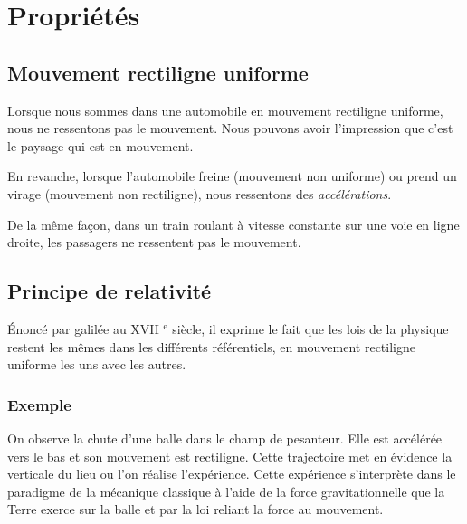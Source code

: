 

\section{Propriétés}

    \subsection{Mouvement rectiligne uniforme}

Lorsque nous sommes dans une automobile en mouvement rectiligne uniforme, nous ne ressentons pas le mouvement. Nous pouvons avoir l'impression que c'est le paysage qui est en mouvement.

 En revanche, lorsque l'automobile freine (mouvement non uniforme) ou prend un virage (mouvement non rectiligne), nous ressentons des {\it accélérations}.

De la même façon, dans un train roulant à vitesse constante sur une voie en ligne droite, les passagers ne ressentent pas le mouvement.

\begin{center}

\end{center}


  \subsection{Principe de relativité}

Énoncé par galilée au {\footnotesize XVII} $^\text{e}$ siècle, il exprime le fait que les lois de la physique restent les mêmes dans les différents référentiels, en mouvement rectiligne uniforme les uns avec les autres.

    \subsubsection{Exemple}

On observe la chute d'une balle dans le champ de pesanteur. Elle est accélérée vers le bas et son mouvement est rectiligne. Cette trajectoire met en évidence la verticale du lieu ou l'on réalise l'expérience. Cette expérience s'interprète dans le paradigme de la mécanique classique à l'aide de la force gravitationnelle que la Terre exerce sur la balle et par la loi reliant la force au mouvement.

\begin{center}

\end{center}

